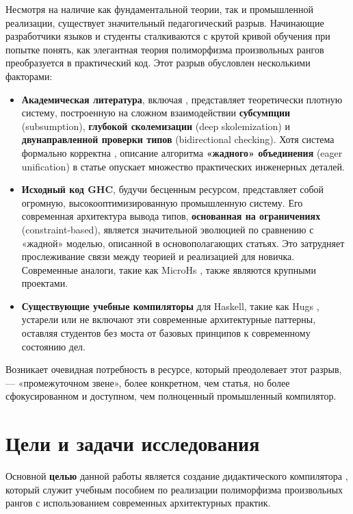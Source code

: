 Несмотря на наличие как фундаментальной теории, так и промышленной реализации, существует значительный педагогический разрыв. Начинающие разработчики языков и студенты сталкиваются с крутой кривой обучения при попытке понять, как элегантная теория полиморфизма произвольных рангов преобразуется в практический код. Этот разрыв обусловлен несколькими факторами:
\begin{itemize}
    \item \textbf{Академическая литература}, включая \cite{jones-practical-2007}, представляет теоретически плотную систему, построенную на сложном взаимодействии \textbf{субсумпции} (subsumption), \textbf{глубокой сколемизации} (deep skolemization) и \textbf{двунаправленной проверки типов} (bidirectional checking). Хотя система формально корректна \cite{practical-type-inference-proofs}, описание алгоритма \textbf{«жадного» объединения} (eager unification) в статье опускает множество практических инженерных деталей.
    \item \textbf{Исходный код GHC}, будучи бесценным ресурсом, представляет собой огромную, высокооптимизированную промышленную систему. Его современная архитектура вывода типов, \textbf{основанная на ограничениях} (constraint-based), является значительной эволюцией по сравнению с «жадной» моделью, описанной в основополагающих статьях. Это затрудняет прослеживание связи между теорией и реализацией для новичка. Современные аналоги, такие как MicroHs \cite{augustsson-microhs-2024, augustss-microhs-2025}, также являются крупными проектами.
    \item \textbf{Существующие учебные компиляторы} для Haskell, такие как Hugs \cite{hugs-haskell}, устарели или не включают эти современные архитектурные паттерны, оставляя студентов без моста от базовых принципов к современному состоянию дел.
\end{itemize}

Возникает очевидная потребность в ресурсе, который преодолевает этот разрыв, — «промежуточном звене», более конкретном, чем статья, но более сфокусированном и доступном, чем полноценный промышленный компилятор.

\newpage

\section*{Цели и задачи исследования}
Основной \textbf{целью} данной работы является создание дидактического компилятора \Arralac, который служит учебным пособием по реализации полиморфизма произвольных рангов с использованием современных архитектурных практик.

